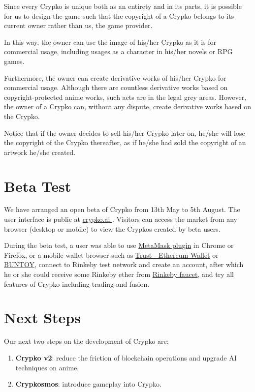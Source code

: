 \documentclass[b5paper]{article}
\begin{document}
Since every Crypko is unique both as an entirety and in its parts, it is possible for us to design the game such that the copyright of a Crypko belongs to its current owner rather than us, the game provider.

In this way, the owner can use the image of his/her Crypko as it is for commercial usage, including usages as a character in his/her novels or RPG games. 

Furthermore, the owner can create derivative works of his/her Crypko for commercial usage.
Although there are countless derivative works based on copyright-protected anime works, such acts are in the legal grey areas. However, the owner of a Crypko can, without any dispute, create derivative works based on the Crypko.

Notice that if the owner decides to sell his/her Crypko later on, he/she will lose the copyright of the Crypko thereafter, as if he/she had sold the copyright of an artwork he/she created.

\section{Beta Test}

We have arranged an open beta of Crypko from 13th May to 5th August. 
The user interface is public at \href{http://crypko.ai}{ crypko.ai }. Visitors can access the market from any browser (desktop or mobile) to view the Crypkos created by beta users.

During the beta test, a user was able to use \href{https://metamask.io/}{MetaMask plugin} in Chrome or Firefox, or a mobile wallet browser such as \href{https://trustwalletapp.com/}{Trust - Ethereum Wallet} or \href{http://www.buntoy.com/} {BUNTOY}, connect to Rinkeby test network and create an account, after which he or she could receive some Rinkeby ether from \href{https://www.rinkeby.io/#faucet}{Rinkeby faucet}, and try all features of Crypko including trading and fusion.

\section{Next Steps}

Our next two steps on the development of Crypko are:
\begin{enumerate}
\item \textbf{Crypko v2}: reduce the friction of blockchain operations and upgrade AI techniques on anime.
\item \textbf{Crypkosmos}: introduce gameplay into Crypko.
\end{enumerate}
\end{document}
